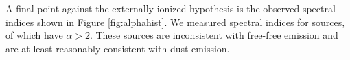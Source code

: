 \documentclass[twocolumn]{aastex61}
\begin{document}
A final point against the externally ionized hypothesis is the observed
spectral indices shown in Figure \ref{fig:alphahist}.  We measured spectral
indices for \nalphas sources, of which \ngttwo have $\alpha>2$.  These sources are
inconsistent with free-free emission and are at least reasonably consistent
with dust emission.



% 
% 


%
\end{document}

